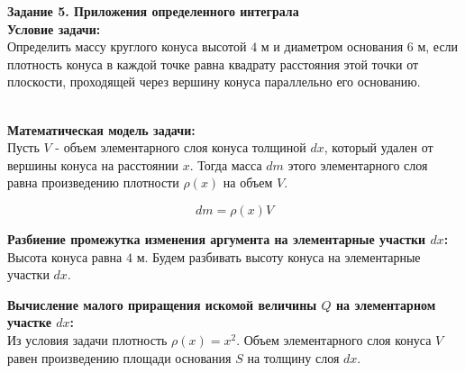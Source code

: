 \documentclass{article}
\begin{document}
\textbf{Задание 5. Приложения определенного интеграла} \\

\textbf{Условие задачи:} \\
Определить массу круглого конуса высотой $4$ м и диаметром основания $6$ м, если
плотность конуса в каждой точке равна квадрату расстояния этой точки от плоскости,
проходящей через вершину конуса параллельно его основанию. \\

\begin{center}
\end{center}

\\

\textbf{Математическая модель задачи:} \\
Пусть $V$ - объем элементарного слоя конуса толщиной $dx$, который удален от вершины конуса на расстоянии $x$. Тогда масса $dm$ этого элементарного слоя равна произведению плотности $\rho(x)$ на объем $V$.

$$
dm = \rho(x) V
$$

\textbf{Разбиение промежутка изменения аргумента на элементарные участки $dx$:} \\
Высота конуса равна $4$ м. Будем разбивать высоту конуса на элементарные участки $dx$.

\textbf{Вычисление малого приращения искомой величины $Q$ на элементарном участке $dx$:} \\
Из условия задачи плотность $\rho(x) = x^2$. Объем элементарного слоя конуса $V$ равен произведению площади основания $S$ на толщину слоя $dx$. 
\end{document}
